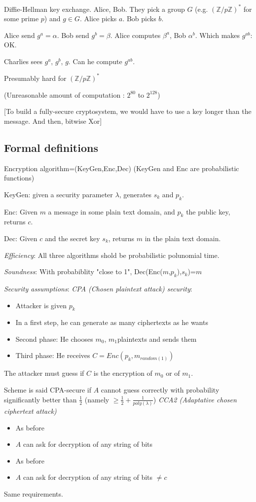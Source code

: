 \documentclass[a4paper,10pt]{article}
\begin{document}
Diffie-Hellman key exchange.
Alice, Bob. They pick a group $G$ (e.g. $(\mathbb{Z}/p \mathbb{Z})^*$ for some prime $p$) and $g \in G$.
Alice picks $a$. Bob picks $b$.

Alice send $g^a=\alpha$. Bob send $g^b=\beta$.
Alice computes $\beta^a$, Bob $\alpha^b$.
Which makes $g^{a b}$: OK.

Charlies sees $g^a$, $g^b$, $g$. Can he compute $g^{a b}$.

Presumably hard for $(\mathbb{Z}/p \mathbb{Z})^*$

(Unreasonable amount of computation : $2^{80}$ to $2^{128}$)

[To build a fully-secure cryptosystem, we would have to use a key longer than the message. And then, bitwise Xor]

\subsection{Formal definitions}

Encryption algorithm=(KeyGen,Enc,Dec) (KeyGen and Enc are probabilistic functions)

KeyGen: given a security parameter $\lambda$, generates $s_k$ and $p_k$.

Enc: Given $m$ a message in some plain text domain, and $p_k$ the public key, returns $c$.

Dec: Given $c$ and the secret key $s_k$, returns $m$ in the plain text domain.

\textit{Efficiency}: All three algorithms shold be probabilistic polunomial time.

\textit{Soundness}: With probabiblity "close to 1", Dec(Enc($m$,$p_k$),$s_k$)=$m$

\textit{Security assumptions}:
\textit{CPA (Chosen plaintext attack) security}:
\begin{itemize}
\item Attacker is given $p_k$
\item In a first step, he can generate as many ciphertexts as he wants
\item Second phase: He chooses $m_0$, $m_1$plaintexts and sends them
\item Third phase: He receives $C=Enc(p_k,m_{random(1)})$
\end{itemize}
The attacker must guess if $C$ is the encryption of $m_0$ or of $m_1$.

Scheme is said CPA-secure if $A$ cannot guess correctly with probability significantly better than $\frac{1}{2}$ (namely $\geq \frac{1}{2}+\frac{1}{poly(\lambda)}$)
\textit{CCA2 (Adaptative chosen ciphertext attack)}
\begin{itemize}
\item As before
\item $A$ can ask for decryption of any string of bits
\item As before
\item $A$ can ask for decryption of any string of bits $\neq c$
\end{itemize}
Same requirements.
\end{document}
